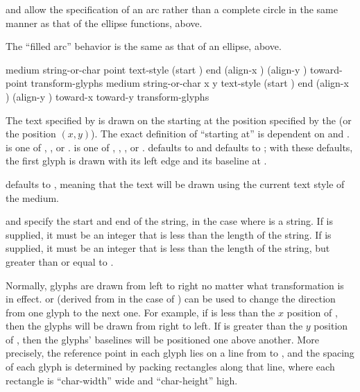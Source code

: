  and  allow the specification of an arc rather
than a complete circle in the same manner as that of the ellipse functions,
above.

The ``filled arc'' behavior is the same as that of an ellipse, above.


  {medium string-or-char point
                     \key text-style (start ) end
                          (align-x ) (align-y )
                          toward-point transform-glyphs
                     \DrawingOptions \TextOptions}
 {medium string-or-char x y
                     \key text-style (start ) end
                          (align-x ) (align-y )
                          toward-x toward-y transform-glyphs
                     \DrawingOptions \TextOptions}

The text specified by  is drawn on the 
 starting at the position specified by the  
(or the position $(x,y)$).  The exact definition of ``starting at'' is dependent
on  and .   is one of ,
, or .   is one of ,
, , or .   defaults to 
and  defaults to ; with these defaults, the first
glyph is drawn with its left edge and its baseline at .

 defaults to , meaning that the text will be drawn using
the current text style of the medium.

 and  specify the start and end of the string, in the case
where  is a string.  If  is supplied, it must be
an integer that is less than the length of the string.  If  is
supplied, it must be an integer that is less than the length of the string, but
greater than or equal to .

Normally, glyphs are drawn from left to right no matter what transformation is
in effect.   or  (derived from  in
the case of ) can be used to change the direction from one glyph
to the next one.  For example, if  is less than the $x$ position
of , then the glyphs will be drawn from right to left.  If
 is greater than the $y$ position of , then the glyphs'
baselines will be positioned one above another.  More precisely, the reference
point in each glyph lies on a line from  to , and
the spacing of each glyph is determined by packing rectangles along that line,
where each rectangle is ``char-width'' wide and ``char-height'' high.

